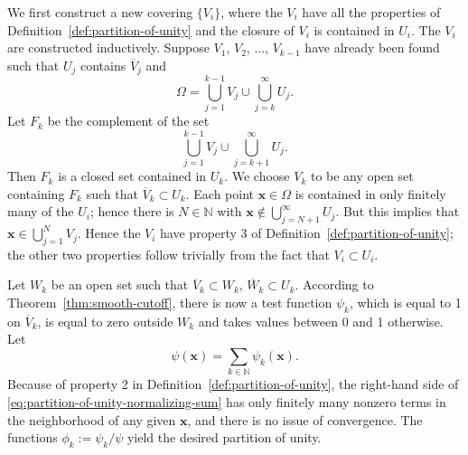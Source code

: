 \begin{Proof}
We first construct a new covering $\{V_i\}$, where the $V_i$ have all the properties of Definition~\ref{def:partition-of-unity} and the closure of $V_i$ is contained in $U_i$. The $V_i$ are constructed inductively. Suppose $V_1$, $V_2$, $\ldots$, $V_{k-1}$ have already been found such that $U_j$ contains $\overline V_j$ and
\begin{equation}\label{eq:shrinking-cover-inductive-invariant}
\Omega=\bigcup_{j=1}^{k-1}V_j\cup\bigcup_{j=k}^\infty U_j.
\end{equation}
Let $F_k$ be the complement of the set
\begin{equation}\label{eq:shrinking-cover-complement-set}
\bigcup_{j=1}^{k-1}V_j\cup\bigcup_{j=k+1}^\infty U_j.
\end{equation}
Then $F_k$ is a closed set contained in $U_k$. We choose $V_k$ to be any open set containing $F_k$ such that $\overline V_k\subset U_k$. Each point $\bm{x}\in\Omega$ is contained in only finitely many of the $U_i$; hence there is $N\in\mathbb{N}$ with $\bm{x}\notin\bigcup_{j=N+1}^\infty U_j$. But this implies that $\bm{x}\in\bigcup_{j=1}^NV_j$. Hence the $V_i$ have property 3 of Definition~\ref{def:partition-of-unity}; the other two properties follow trivially from the fact that $V_i\subset U_i$.

Let $W_k$ be an open set such that $\overline V_k\subset W_k$, $\overline W_k\subset U_k$. According to Theorem~\ref{thm:smooth-cutoff}, there is now a test function $\psi_k$, which is equal to 1 on $\overline V_k$, is equal to zero outside $W_k$ and takes values between 0 and 1 otherwise. Let
\begin{equation}\label{eq:partition-of-unity-normalizing-sum}
\psi(\bm{x})=\sum_{k\in\mathbb{N}}\psi_k(\bm{x}).
\end{equation}
Because of property 2 in Definition~\ref{def:partition-of-unity}, the right-hand side of \eqref{eq:partition-of-unity-normalizing-sum} has only finitely many nonzero terms in the neighborhood of any given $\bm{x}$, and there is no issue of convergence. The functions $\phi_k:=\psi_k/\psi$ yield the desired partition of unity.
\end{Proof}
